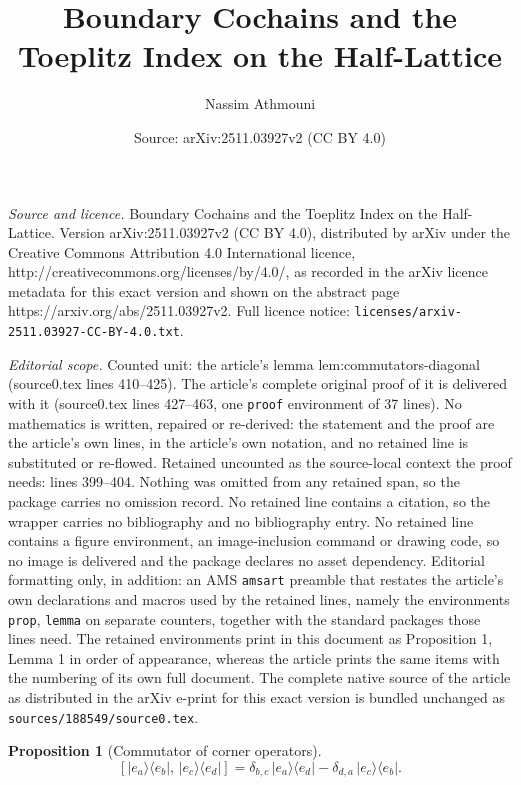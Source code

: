 \documentclass[10pt,a4paper]{amsart}
\title{Boundary Cochains and the Toeplitz Index on the Half-Lattice}
\author{Nassim Athmouni}
\date{Source: arXiv:2511.03927v2 (CC BY 4.0)}
\newtheorem{prop}{Proposition}
\begin{document}
\maketitle

\noindent\emph{Source and licence.} Boundary Cochains and the Toeplitz Index on the Half-Lattice. Version arXiv:2511.03927v2 (CC BY 4.0), distributed by arXiv under the Creative Commons Attribution 4.0 International licence, http://creativecommons.org/licenses/by/4.0/, as recorded in the arXiv licence metadata for this exact version and shown on the abstract page https://arxiv.org/abs/2511.03927v2. Full licence notice: \texttt{licenses/arxiv-2511.03927-CC-BY-4.0.txt}.\par\smallskip

\noindent\textit{Editorial scope.} Counted unit: the article's lemma lem:commutators-diagonal (source0.tex lines 410--425). The article's complete original proof of it is delivered with it (source0.tex lines 427--463, one \texttt{proof} environment of 37 lines). No mathematics is written, repaired or re-derived: the statement and the proof are the article's own lines, in the article's own notation, and no retained line is substituted or re-flowed.  Retained uncounted as the source-local context the proof needs: lines 399--404.  Nothing was omitted from any retained span, so the package carries no omission record.  No retained line contains a citation, so the wrapper carries no bibliography and no bibliography entry.  No retained line contains a figure environment, an image-inclusion command or drawing code, so no image is delivered and the package declares no asset dependency.  Editorial formatting only, in addition: an AMS \texttt{amsart} preamble that restates the article's own declarations and macros used by the retained lines, namely the environments \texttt{prop}, \texttt{lemma} on separate counters, together with the standard packages those lines need.  The retained environments print in this document as Proposition 1, Lemma 1 in order of appearance, whereas the article prints the same items with the numbering of its own full document.  The complete native source of the article as distributed in the arXiv e-print for this exact version is bundled unchanged as \texttt{sources/188549/source0.tex}.
\begin{prop}[Commutator of corner operators]\label{prop:corner-corner}
\[
[|e_a\rangle\langle e_b|,\, |e_c\rangle\langle e_d|]
= \delta_{b,c}\, |e_a\rangle\langle e_d| - \delta_{d,a}\, |e_c\rangle\langle e_b|.
\]
\end{prop}
\end{document}
